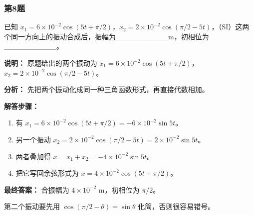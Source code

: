 \documentclass[12pt,a4paper]{ctexart}
\begin{document}
\subsubsection*{第8题}
\begin{tcolorbox}[colback=gray!2!white,colframe=black!60,title={题目}]
已知 \(x_1=6\times10^{-2}\cos(5t+\pi/2)\)，\(x_2=2\times10^{-2}\cos(\pi/2-5t)\)，（SI）这两个同一方向上的振动合成后，振幅为\_\_\_\_\_\_\_\_\_\_m，初相位为\_\_\_\_\_\_\_\_\_\_。\par
\textbf{说明：}
原题给出的两个振动为 \(x_1=6\times 10^{-2}\cos(5t+\pi/2)\)，\(x_2=2\times 10^{-2}\cos(\pi/2-5t)\)。\par
\end{tcolorbox}
\begin{tcolorbox}[colback=blue!2!white,colframe=blue!55!black,title={完整答案}]
\textbf{分析：}
先把两个振动化成同一种三角函数形式，再直接代数相加。\par
\textbf{解答步骤：}
\begin{enumerate}
\item 有 \(x_1=6\times 10^{-2}\cos(5t+\pi/2)=-6\times 10^{-2}\sin 5t\)。
\item 另一个振动 \(x_2=2\times 10^{-2}\cos(\pi/2-5t)=2\times 10^{-2}\sin 5t\)。
\item 两者叠加得 \(x=x_1+x_2=-4\times 10^{-2}\sin 5t\)。
\item 把它写回余弦形式为 \(x=4\times 10^{-2}\cos(5t+\pi/2)\)。
\end{enumerate}
\textbf{最终答案：}
合振幅为 \(4\times 10^{-2}\text{ m}\)，初相位为 \(\pi/2\)。\par
\end{tcolorbox}
\begin{tcolorbox}[colback=red!2!white,colframe=red!55!black,title={易错点}]
第二个振动要先用 \(\cos(\pi/2-\theta)=\sin\theta\) 化简，否则很容易错号。\par
\end{tcolorbox}
\end{document}
